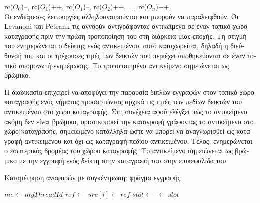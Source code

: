 \begin{greek}
rc($O_0$)--, rc($O_1$)++, rc($O_1$)--, rc($O_2$)++, ..., rc($O_n$)++.\\

Οι ενδιάμεσες λειτουργίες αλληλοαναιρούνται και μπορούν να
παραλειφθούν. Οι Levanoni και Petrank \cite{levanoni1999scalable} 
τις αγνοούν αντιγράφοντας αντικείμενα σε έναν τοπικό χώρο
καταγραφής πριν την πρώτη τροποποίηση του στη διάρκεια μιας
εποχής. Τη στιγμή που ενημερώνεται ο δείκτης ενός αντικειμένου,
αυτό καταχωρείται, δηλαδή η διεύθυνσή του και οι τρέχουσες
τιμές των δεικτών που περιέχει αποθηκεύονται σε έναν τοπικό
απομονωτή ενημέρωσης. Το τροποποιημένο αντικείμενο σημειώνεται
ως βρώμικο.

Η διαδικασία \textenglish{} επιχειρεί να αποφύγει την
παρουσία διπλών εγγραφών στον τοπικό χώρο καταγραφής ενός
νήματος προσαρτώντας αρχικά τις τιμές των πεδίων δεικτών
του αντικειμένου στο χώρο καταγραφής. Στη συνέχεια αφού
ελέγξει πώς το αντικείμενο ακόμη δεν είναι βρώμικο,
οριστικοποιεί την καταγραφή γράφοντας το αντικείμενο στο
χώρο καταγραφής, σημειωμένο κατάλληλα ώστε να μπορεί να
αναγνωρισθεί ως καταγραφή αντικειμένου και όχι ως καταγραφή
πεδίου αντικειμένου. Τέλος, ενημερώνεται ο εσωτερικός δρομέας
του χώρου καταγραφής. Το αντικείμενο σημειώνεται ως βρώμικο
με την εγγραφή ενός δείκτη στην καταγραφή του στην επικεφαλίδα
του. 

\begin{algorithm}
  \caption{Καταμέτρηση αναφορών με συγκέντρωση: φράγμα εγγραφής}
  \label{alg:refcnt_3}
  \begin{algorithmic}[1]
    \State $me \gets myThreadId$
    \Statex
      \State $ref \gets$ 
        \State {}
      \EndIf
      \State $src[i] \gets ref$
    \EndProcedure
    \Statex
          \State {}
        \EndIf
      \EndFor
        \State $slot \gets$ 
        \State {}
      \EndIf  
    \EndProcedure
    \Statex
      \State {}
    \EndFunction
    \Statex
      \State {} $\gets slot$ 
    \EndProcedure
  \end{algorithmic}
\end{algorithm}


\end{greek}
